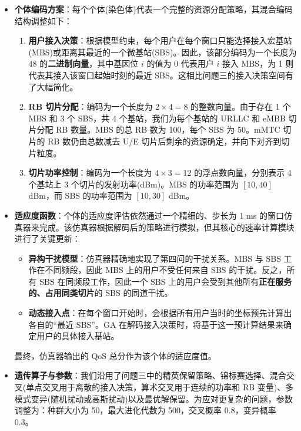 \begin{itemize}
    \item \textbf{个体编码方案}：每个个体(染色体)代表一个完整的资源分配策略，其混合编码结构调整如下：
    \begin{enumerate}
        \item \textbf{用户接入决策}：根据模型约束，每个用户在每个窗口只能选择接入宏基站(MBS)或距离其最近的一个微基站(SBS)。因此，该部分编码为一个长度为 48 的\textbf{二进制向量}，其中基因位 $i$ 的值为 0 代表用户 $i$ 接入 MBS，为 1 则代表其接入该窗口起始时刻的最近 SBS。这相比问题三的接入决策空间有了大幅简化。
        \item \textbf{RB 切片分配}：编码为一个长度为 $2 \times 4 = 8$ 的整数向量。由于存在 1 个 MBS 和 3 个 SBS，共 4 个基站，我们为每个基站的 URLLC 和 eMBB 切片分配 RB 数量。MBS 的总 RB 数为 100，每个 SBS 为 50。mMTC 切片的 RB 数仍由总数减去 U/E 切片后剩余的资源确定，并向下对齐到切片粒度。
        \item \textbf{切片功率控制}：编码为一个长度为 $4 \times 3 = 12$ 的浮点数向量，分别表示 4 个基站上 3 个切片的发射功率(dBm)。MBS 的功率范围为 $[10, 40]$ dBm，而 SBS 的功率范围为 $[10, 30]$ dBm。
    \end{enumerate}

    \item \textbf{适应度函数}：个体的适应度评估依然通过一个精细的、步长为 1 ms 的窗口仿真器来完成。该仿真器根据解码后的策略进行模拟，但其核心的速率计算模块进行了关键更新：
    \begin{itemize}
        \item \textbf{异构干扰模型}：仿真器精确地实现了第四问的干扰关系。MBS 与 SBS 工作在不同频段，因此 MBS 上的用户不受任何来自 SBS 的干扰。反之，所有 SBS 在同频段工作，因此一个 SBS 上的用户会受到其他所有\textbf{正在服务的、占用同类切片}的 SBS 的同道干扰。
        \item \textbf{动态接入点}：在每个窗口开始时，会根据所有用户当时的坐标预先计算出各自的“最近 SBS”。GA 在解码接入决策时，将基于这一预计算结果来确定用户的具体接入基站。
    \end{itemize}
    最终，仿真器输出的 QoS 总分作为该个体的适应度值。

    \item \textbf{遗传算子与参数}：我们沿用了问题三中的精英保留策略、锦标赛选择、混合交叉(单点交叉用于离散的接入决策，算术交叉用于连续的功率和 RB 变量)、多模式变异(随机扰动或高斯扰动)以及最优解保留。为应对更复杂的问题，参数调整为：种群大小为 50，最大进化代数为 500，交叉概率 0.8，变异概率 0.3。
\end{itemize}

